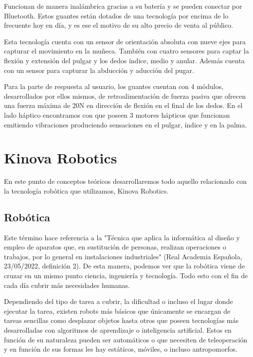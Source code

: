  Funcionan de manera inalámbrica gracias a su batería y se pueden conectar por Bluetooth. Estos guantes están dotados de una tecnología por encima de lo frecuente hoy en día, y es ese el motivo de su alto precio de venta al público.
 
 Esta tecnología cuenta con un sensor de orientación absoluta con nueve ejes para capturar el movimiento en la muñeca. También con cuatro sensores para captar la flexión y extensión del pulgar y los dedos índice, medio y anular. Además cuenta con un sensor para capturar la abducción y aducción del pugar. 
 
 \newpage
 Para la parte de respuesta al usuario, los guantes cuentan con 4 módulos, desarrollados por ellos mismos, de retroalimentación de fuerza pasiva que ofrecen una fuerza máxima de 20N en dirección de flexión en el final de los dedos. En el lado háptico encontramos con que poseen 3 motores hápticos que funcionan emitiendo vibraciones produciendo sensaciones en el pulgar, índice y en la palma.
 

\newpage

\section{Kinova Robotics}
En este punto de conceptos teóricos desarrollaremos todo aquello relacionado con la tecnología robótica que utilizamos, Kinova Robotics.

\subsection{Robótica}
Este término hace referencia a la "Técnica que aplica la informática al diseño y empleo de aparatos que, en sustitución de personas, realizan operaciones o trabajos, por lo general en instalaciones industriales" (Real Academia Española, 23/05/2022, definición 2). De esta manera, podemos ver que la robótica \cite{Robotica} viene de cruzar en un mismo punto ciencia, ingeniería y tecnología. Todo esto con el fin de cada día cubrir más necesidades humanas. 

Dependiendo del tipo de tarea a cubrir, la dificultad o incluso el lugar donde ejecutar la tarea, existen robots más básicos que únicamente se encargan de tareas sencillas como desplazar objetos hasta otros que poseen tecnologías más desarrolladas con algoritmos de aprendizaje o inteligencia artificial. Estos en función de su naturaleza pueden ser automáticos o que necesiten de teleoperación y en función de sus formas les hay estáticos, móviles, o incluso antropomorfos.    


